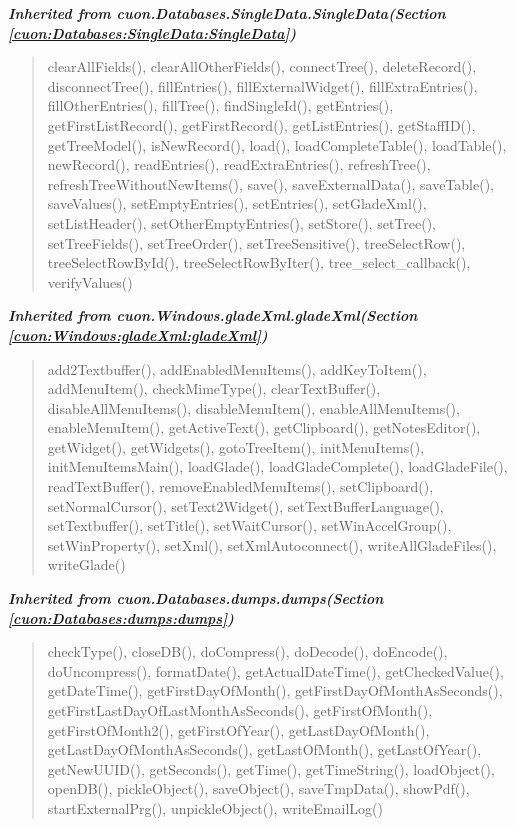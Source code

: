 \large{\textbf{\textit{Inherited from cuon.Databases.SingleData.SingleData\textit{(Section \ref{cuon:Databases:SingleData:SingleData})}}}}

\begin{quote}
clearAllFields(), clearAllOtherFields(), connectTree(), deleteRecord(), disconnectTree(), fillEntries(), fillExternalWidget(), fillExtraEntries(), fillOtherEntries(), fillTree(), findSingleId(), getEntries(), getFirstListRecord(), getFirstRecord(), getListEntries(), getStaffID(), getTreeModel(), isNewRecord(), load(), loadCompleteTable(), loadTable(), newRecord(), readEntries(), readExtraEntries(), refreshTree(), refreshTreeWithoutNewItems(), save(), saveExternalData(), saveTable(), saveValues(), setEmptyEntries(), setEntries(), setGladeXml(), setListHeader(), setOtherEmptyEntries(), setStore(), setTree(), setTreeFields(), setTreeOrder(), setTreeSensitive(), treeSelectRow(), treeSelectRowById(), treeSelectRowByIter(), tree\_select\_callback(), verifyValues()
\end{quote}

\large{\textbf{\textit{Inherited from cuon.Windows.gladeXml.gladeXml\textit{(Section \ref{cuon:Windows:gladeXml:gladeXml})}}}}

\begin{quote}
add2Textbuffer(), addEnabledMenuItems(), addKeyToItem(), addMenuItem(), checkMimeType(), clearTextBuffer(), disableAllMenuItems(), disableMenuItem(), enableAllMenuItems(), enableMenuItem(), getActiveText(), getClipboard(), getNotesEditor(), getWidget(), getWidgets(), gotoTreeItem(), initMenuItems(), initMenuItemsMain(), loadGlade(), loadGladeComplete(), loadGladeFile(), readTextBuffer(), removeEnabledMenuItems(), setClipboard(), setNormalCursor(), setText2Widget(), setTextBufferLanguage(), setTextbuffer(), setTitle(), setWaitCursor(), setWinAccelGroup(), setWinProperty(), setXml(), setXmlAutoconnect(), writeAllGladeFiles(), writeGlade()
\end{quote}

\large{\textbf{\textit{Inherited from cuon.Databases.dumps.dumps\textit{(Section \ref{cuon:Databases:dumps:dumps})}}}}

\begin{quote}
checkType(), closeDB(), doCompress(), doDecode(), doEncode(), doUncompress(), formatDate(), getActualDateTime(), getCheckedValue(), getDateTime(), getFirstDayOfMonth(), getFirstDayOfMonthAsSeconds(), getFirstLastDayOfLastMonthAsSeconds(), getFirstOfMonth(), getFirstOfMonth2(), getFirstOfYear(), getLastDayOfMonth(), getLastDayOfMonthAsSeconds(), getLastOfMonth(), getLastOfYear(), getNewUUID(), getSeconds(), getTime(), getTimeString(), loadObject(), openDB(), pickleObject(), saveObject(), saveTmpData(), showPdf(), startExternalPrg(), unpickleObject(), writeEmailLog()
\end{quote}

